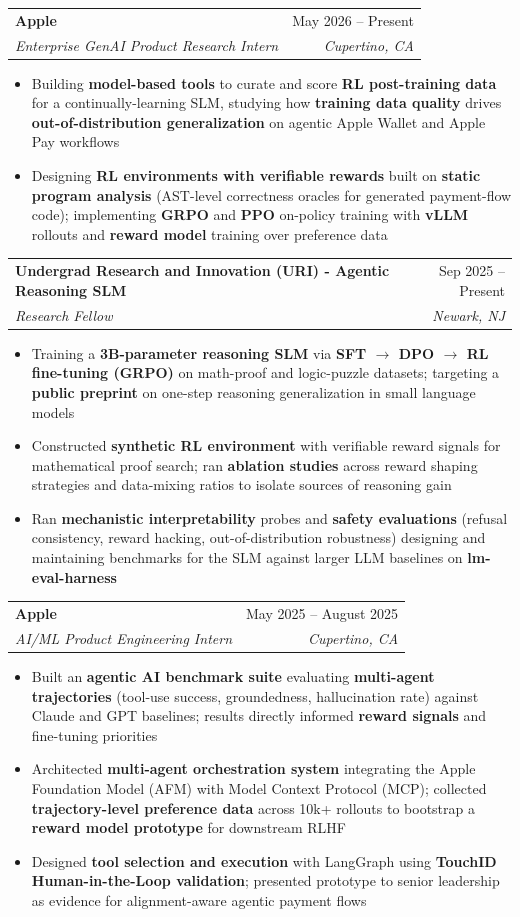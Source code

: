 \documentclass[letterpaper,10pt]{article}
\makeatletter
\newcommand{\resumeItem}[1]{
  \item\small{
    {#1 \vspace{-3pt}}
  }
}
\newcommand{\resumeSubheading}[4]{
  \vspace{-3pt}\item
    \begin{tabular*}{0.97\textwidth}[t]{l@{\extracolsep{\fill}}r}
      \textbf{#1} & #2 \\
      \textit{\small#3} & \textit{\small #4} \\
    \end{tabular*}\vspace{-9pt}
}
\newcommand{\resumeSubSubheading}[2]{
    \item
    \begin{tabular*}{0.97\textwidth}{l@{\extracolsep{\fill}}r}
      \textit{\small#1} & \textit{\small #2} \\
    \end{tabular*}\vspace{-9pt}
}
\newcommand{\resumeSubHeadingListEnd}{\end{itemize}}
\newcommand{\resumeItemListStart}{\begin{itemize}}
\newcommand{\resumeItemListEnd}{\end{itemize}\vspace{-7pt}}
\makeatother
\begin{document}
\resumeSubheading
{Apple}{May 2026 -- Present}
{Enterprise GenAI Product Research Intern}{Cupertino, CA}
\vspace{5pt}
\resumeItemListStart
\resumeItem{Building \textbf{model-based tools} to curate and score \textbf{RL post-training data} for a continually-learning SLM, studying how \textbf{training data quality} drives \textbf{out-of-distribution generalization} on agentic Apple Wallet and Apple Pay workflows}
\resumeItem{Designing \textbf{RL environments with verifiable rewards} built on \textbf{static program analysis} (AST-level correctness oracles for generated payment-flow code); implementing \textbf{GRPO} and \textbf{PPO} on-policy training with \textbf{vLLM} rollouts and \textbf{reward model} training over preference data}
\resumeItemListEnd

\vspace{5pt}
\resumeSubheading
{Undergrad Research and Innovation (URI) - Agentic Reasoning SLM}{Sep 2025 -- Present}
{Research Fellow}{Newark, NJ}
\vspace{5pt}
\resumeItemListStart
\resumeItem{Training a \textbf{3B-parameter reasoning SLM} via \textbf{SFT $\rightarrow$ DPO $\rightarrow$ RL fine-tuning (GRPO)} on math-proof and logic-puzzle datasets; targeting a \textbf{public preprint} on one-step reasoning generalization in small language models}
\resumeItem{Constructed \textbf{synthetic RL environment} with verifiable reward signals for mathematical proof search; ran \textbf{ablation studies} across reward shaping strategies and data-mixing ratios to isolate sources of reasoning gain}
\resumeItem{Ran \textbf{mechanistic interpretability} probes and \textbf{safety evaluations} (refusal consistency, reward hacking, out-of-distribution robustness) designing and maintaining benchmarks for the SLM against larger LLM baselines on \textbf{lm-eval-harness}}
\resumeItemListEnd
\vspace{5pt}
\resumeSubheading
{Apple}{May 2025 -- August 2025}
{AI/ML Product Engineering Intern}{Cupertino, CA}
\vspace{5pt}
\resumeItemListStart
\resumeItem{Built an \textbf{agentic AI benchmark suite} evaluating \textbf{multi-agent trajectories} (tool-use success, groundedness, hallucination rate) against Claude and GPT baselines; results directly informed \textbf{reward signals} and fine-tuning priorities}
\resumeItem{Architected \textbf{multi-agent orchestration system} integrating the Apple Foundation Model (AFM) with Model Context Protocol (MCP); collected \textbf{trajectory-level preference data} across 10k+ rollouts to bootstrap a \textbf{reward model prototype} for downstream RLHF}
\resumeItem{Designed \textbf{tool selection and execution} with LangGraph using \textbf{TouchID Human-in-the-Loop validation}; presented prototype to senior leadership as evidence for alignment-aware agentic payment flows}
\resumeItemListEnd
\end{document}
